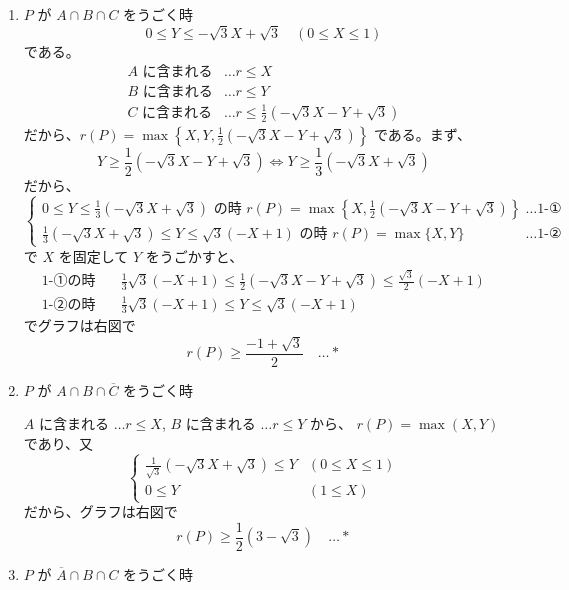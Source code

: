 \documentclass[../main.tex]{subfiles}
\begin{document}
\begin{enumerate}
  \item[$1^\circ$] $P$ が $A \cap B \cap C$ をうごく時
    \[
      0 \le Y \le -\sqrt{3}X + \sqrt{3} \quad (0 \le X \le 1)
    \]
    である。
    \begin{align*}
      A \text{ に含まれる} &\dots r \le X \\
      B \text{ に含まれる} &\dots r \le Y \\
      C \text{ に含まれる} &\dots r \le \frac{1}{2}(-\sqrt{3}X - Y + \sqrt{3})
    \end{align*}
    だから、$r(P) = \max\left\{ X, Y, \frac{1}{2}(-\sqrt{3}X - Y + \sqrt{3}) \right\}$ である。まず、
    \[
      Y \ge \frac{1}{2}(-\sqrt{3}X - Y + \sqrt{3}) \iff Y \ge \frac{1}{3}(-\sqrt{3}X + \sqrt{3})
    \]
    だから、
    \[
      \begin{cases}
        0 \le Y \le \frac{1}{3}(-\sqrt{3}X + \sqrt{3}) \text{ の時 } r(P) = \max\left\{ X, \frac{1}{2}(-\sqrt{3}X - Y + \sqrt{3}) \right\} & \dots \text{1-①} \\
        \frac{1}{3}(-\sqrt{3}X + \sqrt{3}) \le Y \le \sqrt{3}(-X + 1) \text{ の時 } r(P) = \max \{ X, Y \} & \dots \text{1-②}
      \end{cases}
    \]
    で $X$ を固定して $Y$ をうごかすと、
    \begin{align*}
      \text{1-①の時} \quad &\frac{1}{3}\sqrt{3}(-X+1) \le \frac{1}{2}(-\sqrt{3}X - Y + \sqrt{3}) \le \frac{\sqrt{3}}{2}(-X+1) \\
      \text{1-②の時} \quad &\frac{1}{3}\sqrt{3}(-X+1) \le Y \le \sqrt{3}(-X+1)
    \end{align*}
    でグラフは右図で
    \[
      r(P) \ge \frac{-1 + \sqrt{3}}{2} \quad \dots *
    \]

  \item[$2^\circ$] $P$ が $A \cap B \cap \overline{C}$ をうごく時

    $A$ に含まれる $\dots r \le X$, $B$ に含まれる $\dots r \le Y$ から、
    $r(P) = \max(X, Y)$ であり、又
    \[
      \begin{cases}
        \frac{1}{\sqrt{3}}(-\sqrt{3}X + \sqrt{3}) \le Y & (0 \le X \le 1) \\
        0 \le Y & (1 \le X)
      \end{cases}
    \]
    だから、グラフは右図で
    \[
      r(P) \ge \frac{1}{2}(3 - \sqrt{3}) \quad \dots *
    \]

  \item[$3^\circ$] $P$ が $\overline{A} \cap B \cap C$ をうごく時


\end{enumerate}
\end{document}
